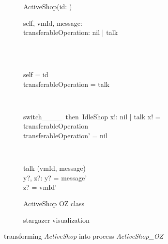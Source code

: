 \begin{figure}[H]
\begin{subfigure}{.6\textwidth}
\centering
\begin{class}{ActiveShop(id: \integer)}
\\
\begin{state}
self, vmId, message: \integer
\\transferableOperation: nil | talk
\end{state} 
\\
\begin{init}
\\self = id
\\transferableOperation = talk
\end{init} 
\\
\begin{op}{switch\_\_\_\_\ then\ IdleShop}
x!: nil | talk
\ST
x! = transferableOperation
\\transferableOperation' = nil
\end{op}
\\
\begin{op}{talk}
\Delta (vmId, message)
\\y?, z?: \integer
\ST
y? = message'
\\z? = vmId'
\end{op}
\end{class}
  \caption{ActiveShop OZ class}
\end{subfigure}%
\begin{subfigure}{.4\textwidth}
  \centering
{}
  \caption{stargazer visualization}
\end{subfigure}
\caption{transforming \textit{ActiveShop} into \picalc{} process \textit{ActiveShop\_OZ}}
\label{tra_activeShop_OZ}
\end{figure}

